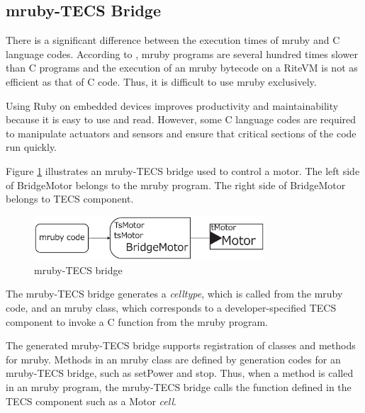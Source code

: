\documentclass[conference]{IEEEtran/IEEEtran/IEEEtran}
\begin{document}
\subsection{mruby-TECS Bridge}
There is a significant difference between the execution times of mruby and C language codes.
According to  \cite{par:mrubyonTECS}, mruby programs are several hundred times slower than C programs and the execution of an mruby bytecode on a RiteVM is not as efficient as that of C code.
Thus, it is difficult to use mruby exclusively.

Using Ruby on embedded devices improves productivity and maintainability because it is easy to use and read.
However, some C language codes are required to manipulate actuators and sensors and ensure that critical sections of the code run quickly.

Figure \ref{fig:mruby_TECS_bridge} illustrates an mruby-TECS bridge used to control a motor.
The left side of BridgeMotor belongs to the mruby program.
The right side of BridgeMotor belongs to TECS component.
\begin{figure}[ht]
    \centering
    \includegraphics[width=8.6cm,clip]{figure/mruby_TECS_bridge.eps}
    \vspace{-2mm}
\caption{mruby-TECS bridge}
    \vspace{-2mm}
\label{fig:mruby_TECS_bridge}
\end{figure}

The mruby-TECS bridge generates a {\it celltype}, which is called from the mruby code, and an mruby class, which corresponds to a developer-specified TECS component to invoke a C function from the mruby program.

The generated mruby-TECS bridge supports registration of classes and methods for mruby.
Methods in an mruby class are defined by generation codes for an mruby-TECS bridge, such as setPower and stop.
Thus, when a method is called in an mruby program, the mruby-TECS bridge calls the function defined in the TECS component such as a Motor {\it cell}.
\end{document}
